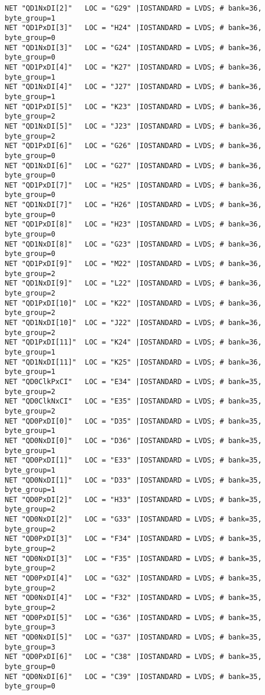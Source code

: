 \begin{appendix}
\begin{verbatim}
NET "QD1NxDI[2]"   LOC = "G29" |IOSTANDARD = LVDS; # bank=36, byte_group=1
NET "QD1PxDI[3]"   LOC = "H24" |IOSTANDARD = LVDS; # bank=36, byte_group=0
NET "QD1NxDI[3]"   LOC = "G24" |IOSTANDARD = LVDS; # bank=36, byte_group=0
NET "QD1PxDI[4]"   LOC = "K27" |IOSTANDARD = LVDS; # bank=36, byte_group=1
NET "QD1NxDI[4]"   LOC = "J27" |IOSTANDARD = LVDS; # bank=36, byte_group=1
NET "QD1PxDI[5]"   LOC = "K23" |IOSTANDARD = LVDS; # bank=36, byte_group=2
NET "QD1NxDI[5]"   LOC = "J23" |IOSTANDARD = LVDS; # bank=36, byte_group=2
NET "QD1PxDI[6]"   LOC = "G26" |IOSTANDARD = LVDS; # bank=36, byte_group=0
NET "QD1NxDI[6]"   LOC = "G27" |IOSTANDARD = LVDS; # bank=36, byte_group=0
NET "QD1PxDI[7]"   LOC = "H25" |IOSTANDARD = LVDS; # bank=36, byte_group=0
NET "QD1NxDI[7]"   LOC = "H26" |IOSTANDARD = LVDS; # bank=36, byte_group=0
NET "QD1PxDI[8]"   LOC = "H23" |IOSTANDARD = LVDS; # bank=36, byte_group=0
NET "QD1NxDI[8]"   LOC = "G23" |IOSTANDARD = LVDS; # bank=36, byte_group=0
NET "QD1PxDI[9]"   LOC = "M22" |IOSTANDARD = LVDS; # bank=36, byte_group=2
NET "QD1NxDI[9]"   LOC = "L22" |IOSTANDARD = LVDS; # bank=36, byte_group=2
NET "QD1PxDI[10]"  LOC = "K22" |IOSTANDARD = LVDS; # bank=36, byte_group=2
NET "QD1NxDI[10]"  LOC = "J22" |IOSTANDARD = LVDS; # bank=36, byte_group=2
NET "QD1PxDI[11]"  LOC = "K24" |IOSTANDARD = LVDS; # bank=36, byte_group=1
NET "QD1NxDI[11]"  LOC = "K25" |IOSTANDARD = LVDS; # bank=36, byte_group=1
NET "QD0ClkPxCI"   LOC = "E34" |IOSTANDARD = LVDS; # bank=35, byte_group=2
NET "QD0ClkNxCI"   LOC = "E35" |IOSTANDARD = LVDS; # bank=35, byte_group=2
NET "QD0PxDI[0]"   LOC = "D35" |IOSTANDARD = LVDS; # bank=35, byte_group=1
NET "QD0NxDI[0]"   LOC = "D36" |IOSTANDARD = LVDS; # bank=35, byte_group=1
NET "QD0PxDI[1]"   LOC = "E33" |IOSTANDARD = LVDS; # bank=35, byte_group=1
NET "QD0NxDI[1]"   LOC = "D33" |IOSTANDARD = LVDS; # bank=35, byte_group=1
NET "QD0PxDI[2]"   LOC = "H33" |IOSTANDARD = LVDS; # bank=35, byte_group=2
NET "QD0NxDI[2]"   LOC = "G33" |IOSTANDARD = LVDS; # bank=35, byte_group=2
NET "QD0PxDI[3]"   LOC = "F34" |IOSTANDARD = LVDS; # bank=35, byte_group=2
NET "QD0NxDI[3]"   LOC = "F35" |IOSTANDARD = LVDS; # bank=35, byte_group=2
NET "QD0PxDI[4]"   LOC = "G32" |IOSTANDARD = LVDS; # bank=35, byte_group=2
NET "QD0NxDI[4]"   LOC = "F32" |IOSTANDARD = LVDS; # bank=35, byte_group=2
NET "QD0PxDI[5]"   LOC = "G36" |IOSTANDARD = LVDS; # bank=35, byte_group=3
NET "QD0NxDI[5]"   LOC = "G37" |IOSTANDARD = LVDS; # bank=35, byte_group=3
NET "QD0PxDI[6]"   LOC = "C38" |IOSTANDARD = LVDS; # bank=35, byte_group=0
NET "QD0NxDI[6]"   LOC = "C39" |IOSTANDARD = LVDS; # bank=35, byte_group=0

\end{verbatim}
\end{appendix}
